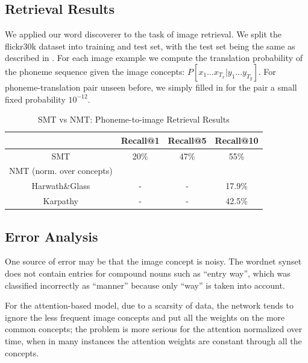 \documentclass[a4paper]{article}
\begin{document}
\subsection{Retrieval Results}
We applied our word discoverer to the task of image retrieval. We split the flickr30k dataset into training and test set, with the test set being the same as described in \cite{Karpathy16-CIA}. For each image example we compute the translation probability of the phoneme sequence given the image concepts: $P[x_1\ldots x_{T_x}|y_1\ldots y_{T_y}]$. For phoneme-translation pair unseen before, we simply filled in for the pair a small fixed probability $10^{-12}$. 
\begin{table}[th]
    \centering
    \caption{SMT vs NMT: Phoneme-to-image Retrieval Results}
    \begin{tabular}{|c|c|c|c|}
    \hline
             & Recall@1 & Recall@5 & Recall@10\\
             \hline
         SMT & 20\% & 47\% & 55\% \\
         NMT (norm. over concepts) &  &  &  \\
         Harwath\&Glass & - & - & 17.9\% \\
         Karpathy \cite{Karpathy16-CIA} &- &- & 42.5\%\\
         \hline
    \end{tabular}
    \label{tab:retrieval_res}
\end{table}

\subsection{Error Analysis}
One source of error may be that the image concept is noisy. The wordnet synset does not contain entries for compound nouns such as ``entry way'', which was classified incorrectly as ``manner'' because only ``way'' is taken into account. 






For the attention-based model, due to a scarsity of data, the network tends to ignore the less frequent image concepts and put all the weights on the more common concepts; the problem is more serious for the attention normalized over time, when in many instances the attention weights are constant through all the concepts.
\end{document}
